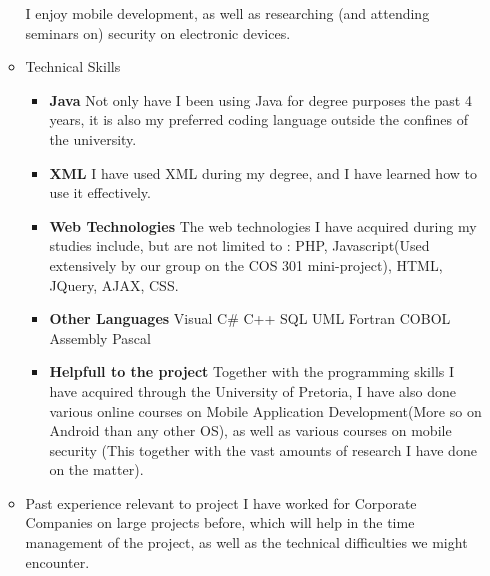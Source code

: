 \documentclass[12pt, oneside]{article}
\begin{document}
\begin{enumerate}
\begin{itemize}
				I enjoy mobile development, as well as researching (and attending seminars on) security on electronic devices.
			\item Technical Skills\newline
				\begin{itemize}
				\item {\bf Java}\newline
					Not only have I been using Java for degree purposes the past 4 years, it is also my preferred coding language
					outside the confines of the university.
				\item {\bf XML}\newline
					I have used XML during my degree, and I have learned how to use it effectively.
				\item {\bf Web Technologies}\newline
					The web technologies I have acquired during my studies include, but are not limited to :
					PHP, Javascript(Used extensively by our group on the COS 301 mini-project), HTML, JQuery, AJAX, CSS.
				\item {\bf Other Languages}\newline
					Visual C\#\newline
					C++\newline
					SQL\newline
					UML\newline	
					Fortran\newline
					COBOL\newline
					Assembly\newline
					Pascal\newline
				\item {\bf Helpfull to the project}\newline
					Together with the programming skills I have acquired through the University of Pretoria, I have also done various online
					courses on Mobile Application Development(More so on Android than any other OS), as well as various courses on mobile security
					(This together with the vast amounts of research I have done on the matter).\newline
				\end{itemize}
			\item Past experience relevant to project\newline\newline
				I have worked for Corporate Companies on large projects before, which will help in the time management of the project,
				as well as the technical difficulties we might encounter.
				

\end{itemize}
\end{enumerate}
\end{document}

